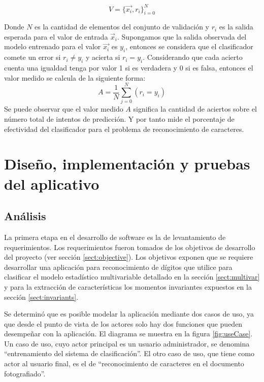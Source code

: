 \documentclass[a4paper, 11pt, oneside]{report}
\begin{document}
\[ V = \{\vec{x_i},r_i\}_{i=0}^N \]

Donde $N$ es la cantidad de elementos del conjunto de validación y $r_i$ es la salida esperada para el valor de entrada $\vec{x}_i$. Supongamos que la salida observada del modelo entrenado para el valor $\vec{x_i}$ es $y_i$, entonces se considera que el clasificador comete un error si $r_i \ne y_i$ y acierta si $r_i = y_i$. Considerando que cada acierto cuenta  una igualdad tenga por valor 1 si es verdadera y 0 si es falsa, entonces el valor medido se calcula de la siguiente forma:
\[ A = \frac{1}{N} \sum_{j=0}^{N}(r_i=y_i) \]
Se puede observar que el valor medido $A$ significa la cantidad de aciertos sobre el número total de intentos de predicción. Y por tanto mide el porcentaje de efectividad del clasificador para el problema de reconocimiento de caracteres.

\chapter{Diseño, implementación y pruebas del aplicativo}
\label{chap:ingSw}

\section{Análisis}

La primera etapa en el desarrollo de software es la de levantamiento de requerimientos. Los requerimientos fueron tomados de los objetivos de desarrollo del proyecto (ver sección \ref{sect:objective}). Los objetivos exponen que se requiere desarrollar una aplicación para reconocimiento de dígitos que utilice para clasificar el modelo estadístico multivariable detallado en la sección \ref{sect:multivar} y para la extracción de características los momentos invariantes expuestos en la sección \ref{sect:invariants}.

Se determinó que es posible modelar la aplicación mediante dos casos de uso, ya que desde el punto de vista de los actores solo hay dos funciones que pueden desempeñar con la aplicación. El diagrama se muestra en la figura \ref{fig:useCase}. Un caso de uso, cuyo actor principal es un usuario administrador, se denomina ``entrenamiento del sistema de clasificación''. El otro caso de uso, que tiene como actor al usuario final, es el de ``reconocimiento de caracteres en el documento fotografiado''.
\end{document}
